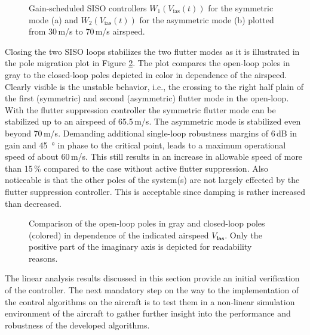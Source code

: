 \documentclass[aerospace,article,submit,moreauthors,pdftex,10pt,a4paper]{Definitions/mdpi}
\begin{document}
\begin{figure}[h]
	\centering
	
	\caption{Gain-scheduled \ac{SISO} controllers $W_{1}(V_{\text{ias}}(t))$ for the symmetric mode (a) and $W_{2}(V_{\text{ias}}(t))$ for the asymmetric mode (b) plotted from 30\,m/s to 70\,m/s airspeed.}
	\label{fig:sisoC}	
\end{figure}



Closing the two SISO loops stabilizes the two flutter modes as it is illustrated in the pole migration plot in Figure  \ref{fig:poles}. The plot compares the open-loop poles in gray to the closed-loop poles depicted in color in dependence of the airspeed. Clearly visible is the unstable behavior, i.e., the crossing to the right half plain of the first (symmetric) and second (asymmetric) flutter mode in the open-loop. With the flutter suppression controller the symmetric flutter mode can be stabilized up to an airspeed of 65.5\,m/s. The asymmetric mode is stabilized even beyond  70\,m/s. Demanding additional single-loop robustness margins of 6\,dB in gain and \SI{45}{\degree} in phase to the critical point, leads to a maximum operational speed of about 60\,m/s. This still results in an increase in allowable speed of more than 15\,\% compared to the case without active flutter suppression. Also noticeable is that the other poles of the system(s) are not largely effected by the flutter suppression controller. This is acceptable since damping is rather increased than decreased.



\begin{figure}[h]
	\centering
	
	\caption{Comparison of the open-loop poles in gray and closed-loop poles  (colored) in dependence of the indicated airspeed $V_{\textbf{ias}}$. Only the positive part of the imaginary axis is depicted for readability reasons.}
	\label{fig:poles}	
\end{figure}

The  linear analysis results discussed in this section provide an initial verification of the controller. The next mandatory step on the way to the implementation of the control algorithms on the aircraft is to test them in a non-linear simulation environment of the aircraft to gather further insight into the performance and robustness of the developed algorithms.
 
\end{document}
